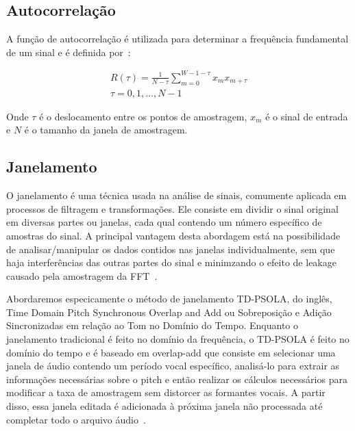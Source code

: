 \documentclass{sbrt}
\begin{document}
\subsection{Autocorrelação}

A função de autocorrelação é utilizada para determinar a frequência fundamental de um sinal e é definida
por~\cite{fong2016adaptive}:

\begin{equation}
  \begin{gathered}
    R(\tau) = \frac{1}{N - \tau} \sum_{m=0}^{W - 1 - \tau} x_m x_{m + \tau} \\
    \tau = 0, 1, \dots, N - 1
  \end{gathered}
\end{equation}

Onde $\tau$ é o deslocamento entre os pontos de amostragem, $x_m$ é o sinal de entrada e $N$ é o tamanho da janela de
amostragem.

\subsection{Janelamento}

O janelamento é uma técnica usada na análise de sinais, comumente aplicada em processos de filtragem e transformações.
Ele consiste em dividir o sinal original em diversas partes ou janelas, cada qual contendo um número específico de
amostras do sinal. A principal vantagem desta abordagem está na possibilidade de analisar/manipular os dados contidos
nas janelas individualmente, sem que haja interferências das outras partes do sinal e minimzando o efeito de leakage
causado pela amostragem da FFT~\cite{deimplementaccao}.

Abordaremos especicamente o método de janelamento TD-PSOLA, do inglês, Time Domain Pitch Synchronous Overlap and Add ou
Sobreposição e Adição Sincronizadas em relação ao Tom no Domínio do Tempo. Enquanto o janelamento tradicional é feito no
domínio da frequência, o TD-PSOLA é feito no domínio do tempo e é baseado em overlap-add que consiste em selecionar uma
janela de áudio contendo um período vocal específico, analisá-lo para extrair as informações necessárias sobre o pitch e
então realizar os cálculos necessários para modificar a taxa de amostragem sem distorcer as formantes vocais. A partir
disso, essa janela editada é adicionada à próxima janela não processada até completar todo o arquivo
áudio~\cite{cheng2012design}.

\end{document}
